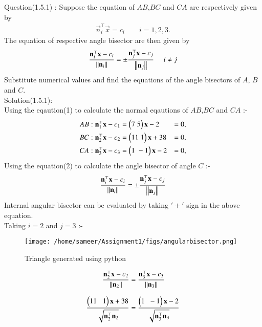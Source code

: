 \documentclass[journal,12pt,twocolumn]{IEEEtran}
\theoremstyle{remark}
\begin{document}
%
Question(1.5.1) : Suppose the equation of $AB$,$BC$ and $CA$ are respectively given by 
\begin{align}
\vec{n}^{\top}_i\vec{x} = c_i\qquad i=1,2,3.
\end{align}
The equation of respective angle bisector are then given by 
\begin{align}
\dfrac{\mathbf{n}^{\top}_i\mathbf{x}-c_i}{\left\lVert\mathbf{n}_i\right\rVert} =  \pm\dfrac{\mathbf{n}^{\top}_j\mathbf{x}-c_j}{\left\lVert\mathbf{n}_j\right\rVert}\,\,\,\,\,\,\,\, i \neq j
\end{align}
Substitute numerical values and find the equations of the angle bisectors of $A$, $B$ and $C$.\\
Solution(1.5.1):\\
Using the eqaution(1) to calculate the normal eqautions of $AB$,$BC$ and $CA$ :-
\begin{align}
AB :   \mathbf{n}^{\top}_1\mathbf{x} - c_1  &=  \begin{pmatrix}7 \; 5\end{pmatrix}\mathbf{x} - 2 &=0,\\
BC :   \mathbf{n}^{\top}_2\mathbf{x} - c_2  &=  \begin{pmatrix}11 \; 1\end{pmatrix}\mathbf{x} + 38 &=0,\\
CA :   \mathbf{n}^{\top}_3\mathbf{x} - c_3  &=  \begin{pmatrix}1 \; -1\end{pmatrix}\mathbf{x} - 2 &=0,
\end{align}
Using the equation(2) to calculate the angle bisector of angle $C$ :-
\begin{align}
\dfrac{\mathbf{n}^{\top}_i\mathbf{x}-c_i}{\left\lVert\mathbf{n}_i\right\rVert} =  \pm\dfrac{\mathbf{n}^{\top}_j\mathbf{x}-c_j}{\left\lVert\mathbf{n}_j\right\rVert}
\end{align}
Internal angular bisector can be evaluated by taking $'+'$ sign in the above equation.\\
Taking $i=2$ and $j=3$ :-
\begin{figure}
\centering
\texttt{[image: /home/sameer/Assignment1/figs/angularbisector.png]}
\caption{Triangle generated using python}
\label{fig: Angular bisector}
\end{figure}
\begin{align}
\dfrac{\mathbf{n}^{\top}_2\mathbf{x}-c_2}{\left\lVert\mathbf{n}_2\right\rVert} &=  \dfrac{\mathbf{n}^{\top}_3\mathbf{x}-c_3}{\left\lVert\mathbf{n}_3\right\rVert}\\[8pt]
\dfrac{\begin{pmatrix}11\;\;\;1\end{pmatrix}\mathbf{x}+38}{\sqrt{\mathbf{n}^{\top}_2\mathbf{n}_2}} &=  \dfrac{\begin{pmatrix}1\;\;-1\end{pmatrix}\mathbf{x}-2}{\sqrt{\mathbf{n}^{\top}_3 \mathbf{n}_3}}
\end{align}
\end{document}
